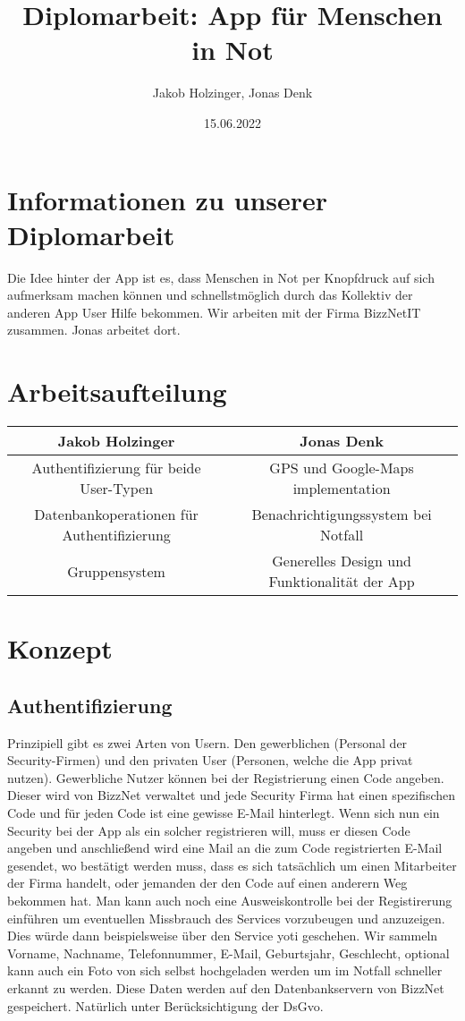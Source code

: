 \documentclass{article}
\title{Diplomarbeit: App für Menschen in Not}
\date{15.06.2022}
\author{Jakob Holzinger, Jonas Denk}
\begin{document}
\maketitle
\frenchspacing
\raggedbottom
\pagestyle{plain}
\section{Informationen zu unserer Diplomarbeit}
Die Idee hinter der App ist es, dass Menschen in Not per Knopfdruck auf sich aufmerksam machen können und schnellstmöglich durch das Kollektiv der anderen App User Hilfe bekommen.
Wir arbeiten mit der Firma BizzNetIT zusammen. Jonas arbeitet dort.
\section{Arbeitsaufteilung}
\begin{table}[H]
	\centering
	\begin{tabular}{|c|c|}
		\hline
		Jakob Holzinger   & Jonas Denk                 \\ \hline
		Authentifizierung für beide User-Typen & GPS und Google-Maps implementation \\ \hline
		Datenbankoperationen für Authentifizierung                 & Benachrichtigungssystem bei Notfall                          \\ \hline
		Gruppensystem                 & Generelles Design und Funktionalität der App                          \\ \hline
	\end{tabular}
\end{table}
\section{Konzept}
\subsection{Authentifizierung}
Prinzipiell gibt es zwei Arten von Usern. Den gewerblichen (Personal der Security-Firmen) und den privaten User (Personen, welche die App privat nutzen). 
Gewerbliche Nutzer können bei der Registrierung einen Code angeben. Dieser wird von BizzNet verwaltet und jede Security Firma hat einen spezifischen Code und für jeden Code ist eine gewisse E-Mail hinterlegt. Wenn sich nun ein Security bei der App als ein solcher registrieren will, muss er diesen Code angeben und anschließend wird eine Mail an die zum Code registrierten E-Mail gesendet, wo bestätigt werden muss, dass es sich tatsächlich um einen Mitarbeiter der Firma handelt, oder jemanden der den Code auf einen anderern Weg bekommen hat.
Man kann auch noch eine Ausweiskontrolle bei der Registirerung einführen um eventuellen Missbrauch des Services vorzubeugen und anzuzeigen. Dies würde dann beispielsweise über den Service yoti geschehen.
Wir sammeln Vorname, Nachname, Telefonnummer, E-Mail, Geburtsjahr, Geschlecht, optional kann auch ein Foto von sich selbst hochgeladen werden um im Notfall schneller erkannt zu werden. Diese Daten werden auf den Datenbankservern von BizzNet gespeichert. Natürlich unter Berücksichtigung der DsGvo.
\end{document}
